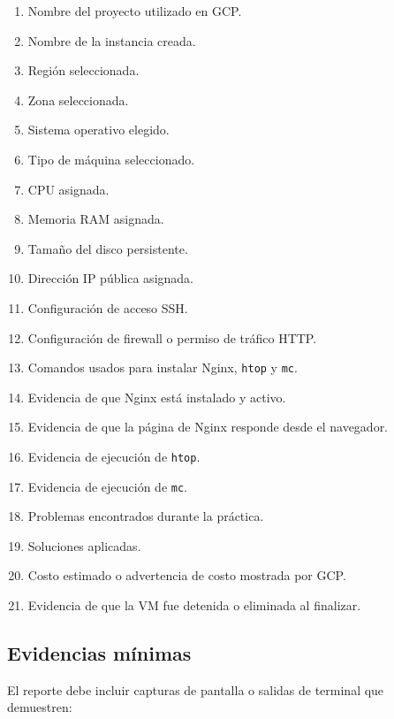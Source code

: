 \documentclass[
  coursetitle={Cómputo Nube y Tecnologías Emergentes},
  coursehours={96},
  coursedate={Verano 2026},
  doctype={Tarea 2},
  otherlangs={english,french},
  authorname={Lázaro},
  authorsurname={Bustio-Martínez},
  authortitle={PhD},
  role={Profesor Investigador},
  email={lbustio@inaoe.mx},
  phone={5559504000},
  ext={7459},
  institution={Instituto Nacional de Astrofísica, Óptica y Electrónica (INAOE)},
  department={Maestría en Ciencias en Tecnologías de Seguridad},
  address={Luis Enrique Erro 1, Sta. Ma. Tonantzintla, San Andrés Cholula, CP 72840, Puebla, México},
  margin={0.5in}
]{lbustio_lecture_notes}
\begin{document}
\begin{enumerate}
  \item Nombre del proyecto utilizado en GCP.
  \item Nombre de la instancia creada.
  \item Región seleccionada.
  \item Zona seleccionada.
  \item Sistema operativo elegido.
  \item Tipo de máquina seleccionado.
  \item CPU asignada.
  \item Memoria RAM asignada.
  \item Tamaño del disco persistente.
  \item Dirección IP pública asignada.
  \item Configuración de acceso SSH.
  \item Configuración de firewall o permiso de tráfico HTTP.
  \item Comandos usados para instalar Nginx, \texttt{htop} y \texttt{mc}.
  \item Evidencia de que Nginx está instalado y activo.
  \item Evidencia de que la página de Nginx responde desde el navegador.
  \item Evidencia de ejecución de \texttt{htop}.
  \item Evidencia de ejecución de \texttt{mc}.
  \item Problemas encontrados durante la práctica.
  \item Soluciones aplicadas.
  \item Costo estimado o advertencia de costo mostrada por GCP.
  \item Evidencia de que la VM fue detenida o eliminada al finalizar.
\end{enumerate}

\subsection{Evidencias mínimas}
\label{sec:tarea2-evidencias}

El reporte debe incluir capturas de pantalla o salidas de terminal que demuestren:
\end{document}
